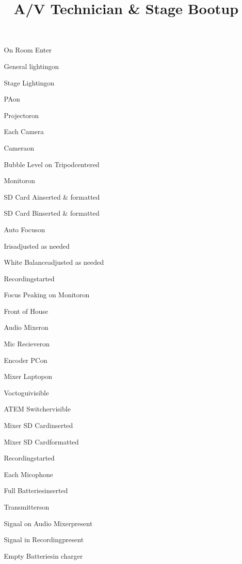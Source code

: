 \def\papersize{4}




\title{A/V Technician & Stage Bootup}

\begin{checklist}{On Room Enter}
  \item{General lighting}{on}
  \item{Stage Lighting}{on}
  \item{PA}{on}
  \item{Projector}{on}
\end{checklist}

\begin{checklist}{Each Camera}
  \item{Camera}{on}
  \item{Bubble Level on Tripod}{centered}
  \item{Monitor}{on}
  \item{SD Card A}{inserted \& formatted}
  \item{SD Card B}{inserted \& formatted}
  \item{Auto Focus}{on}
  \item{Iris}{adjusted as needed}
  \item{White Balance}{adjusted as needed}
  \item{Recording}{started}
  \item{Focus Peaking on Monitor}{on}
\end{checklist}

\begin{checklist}{Front of House}
  \item{Audio Mixer}{on}
  \item{Mic Reciever}{on}
  \item{Encoder PC}{on}
  \item{Mixer Laptop}{on}
  \item{Voctogui}{visible}
  \item{ATEM Switcher}{visible}
  \item{Mixer SD Card}{inserted}
  \item{Mixer SD Card}{formatted}
  \item{Recording}{started}
\end{checklist}

\begin{checklist}{Each Micophone}
  \item{Full Batteries}{inserted}
  \item{Transmitters}{on}
  \item{Signal on Audio Mixer}{present}
  \item{Signal in Recording}{present}
  \item{Empty Batteries}{in charger}
\end{checklist}

